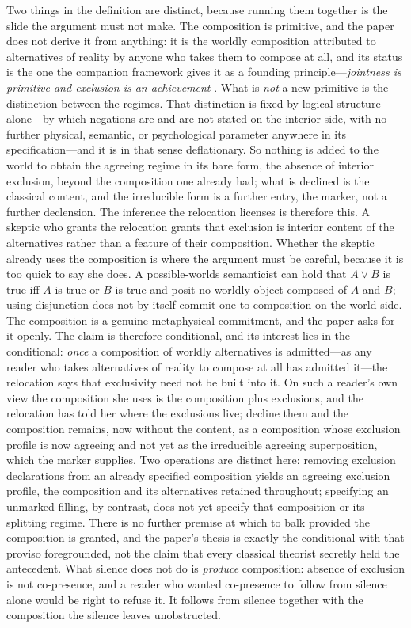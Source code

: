 \documentclass[11pt]{article}
\begin{document}
\noindent Two things in the definition are distinct, because running them together is the slide the argument must not make. The composition is primitive, and the paper does not derive it from anything: it is the worldly composition attributed to alternatives of reality by anyone who takes them to compose at all, and its status is the one the companion framework gives it as a founding principle---\emph{jointness is primitive and exclusion is an achievement} \parencite{Aethus}. What is \emph{not} a new primitive is the distinction between the regimes. That distinction is fixed by logical structure alone---by which negations are and are not stated on the interior side, with no further physical, semantic, or psychological parameter anywhere in its specification---and it is in that sense deflationary. So nothing is added to the world to obtain the agreeing regime in its bare form, the absence of interior exclusion, beyond the composition one already had; what is declined is the classical content, and the irreducible form is a further entry, the marker, not a further declension. The inference the relocation licenses is therefore this. A skeptic who grants the relocation grants that exclusion is interior content of the alternatives rather than a feature of their composition. Whether the skeptic already uses the composition is where the argument must be careful, because it is too quick to say she does. A possible-worlds semanticist can hold that $A \vee B$ is true iff $A$ is true or $B$ is true and posit no worldly object composed of $A$ and $B$; using disjunction does not by itself commit one to composition on the world side. The composition is a genuine metaphysical commitment, and the paper asks for it openly. The claim is therefore conditional, and its interest lies in the conditional: \emph{once} a composition of worldly alternatives is admitted---as any reader who takes alternatives of reality to compose at all has admitted it---the relocation says that exclusivity need not be built into it. On such a reader's own view the composition she uses is the composition plus exclusions, and the relocation has told her where the exclusions live; decline them and the composition remains, now without the content, as a composition whose exclusion profile is now agreeing and not yet as the irreducible agreeing superposition, which the marker supplies. Two operations are distinct here: removing exclusion declarations from an already specified composition yields an agreeing exclusion profile, the composition and its alternatives retained throughout; specifying an unmarked filling, by contrast, does not yet specify that composition or its splitting regime. There is no further premise at which to balk provided the composition is granted, and the paper's thesis is exactly the conditional with that proviso foregrounded, not the claim that every classical theorist secretly held the antecedent. What silence does not do is \emph{produce} composition: absence of exclusion is not co-presence, and a reader who wanted co-presence to follow from silence alone would be right to refuse it. It follows from silence together with the composition the silence leaves unobstructed.
\end{document}
